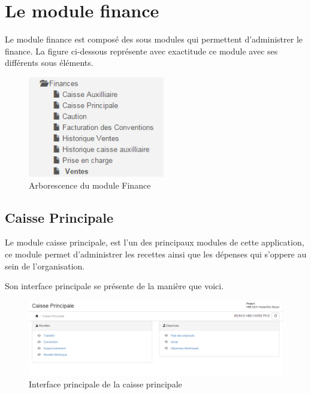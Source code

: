 \documentclass[12pt,a4paper]{report}
\begin{document}
\newpage
\chapter{Le module finance}        
Le module finance est composé des sous modules qui permettent d'administrer le finance. La figure ci-dessous représente avec exactitude ce module avec ses différents sous éléments.

\begin{figure}[h]
\begin{center}
\includegraphics[width=6cm]{pic/FinanceArbo.png}
\end{center}
\caption{Arborescence du module Finance}
\label{Arborescence du module Finance}
\end{figure}

\section{Caisse Principale}
Le module caisse principale, est l'un des principaux modules de cette application, ce module permet d'administrer les recettes ainsi que les dépenses qui s'oppere au sein de l'organisation.

Son interface principale se présente de la manière que voici.

\begin{figure}[h]
\begin{center}
\includegraphics[width=14cm]{pic/caissePrincipale.png}
\end{center}
\caption{Interface principale de la caisse principale}
\label{Interface principale de la caisse principale}
\end{figure}
\end{document}

